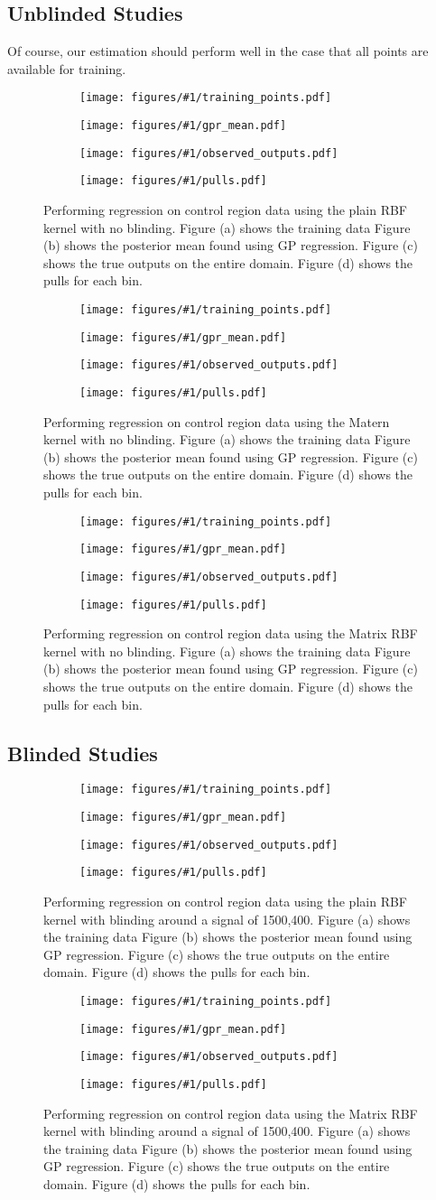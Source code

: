 \documentclass[10pt]{article}
\theoremstyle{definition}
\begin{document}
\newcommand{\makegrid}[3]{
  \begin{figure}[]
    \centering
    \begin{subfigure}[b]{0.45\textwidth}
      \centering
      \texttt{[image: figures/\#1/training\_points.pdf]}
      \caption{}
    \end{subfigure}
    \begin{subfigure}[b]{0.45\textwidth}
      \centering
      \texttt{[image: figures/\#1/gpr\_mean.pdf]}
      \caption{}
    \end{subfigure}
    \begin{subfigure}[b]{0.45\textwidth}
      \centering
      \texttt{[image: figures/\#1/observed\_outputs.pdf]}
      \caption{}
    \end{subfigure}
    \begin{subfigure}[b]{0.45\textwidth}
      \centering
      \texttt{[image: figures/\#1/pulls.pdf]}
      \caption{}
    \end{subfigure}
    \caption{Performing regression on control region data using the #2 kernel with #3.
      Figure (a) shows the training data
      Figure (b) shows the posterior mean found using GP regression.
      Figure (c) shows the true outputs on the entire domain.
      Figure (d) shows the pulls for each bin.}
  \end{figure}
}

\subsection{Unblinded Studies}
Of course, our estimation should perform well in the case that all points are available for training. 
\makegrid{pure_rbf}{plain RBF}{no blinding}
\makegrid{matern}{Matern}{no blinding}
\makegrid{matrix_rbf}{Matrix RBF}{no blinding}

\subsection{Blinded Studies}

\makegrid{pure_rbf_window_1300_1500__0p55_0p65}{plain RBF}{blinding around a signal of 1500,400}




\makegrid{matrix_rbf_window_1300_1500__0p55_0p65}{Matrix RBF}{blinding around a signal of 1500,400}
\end{document}
